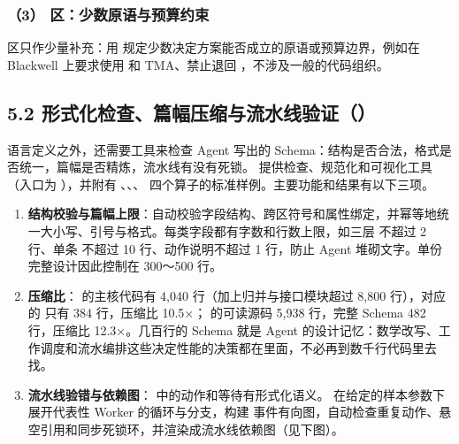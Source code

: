 \subsubsection{（3） 区：少数原语与预算约束}
 区只作少量补充：用  规定少数决定方案能否成立的原语或预算边界，例如在 Blackwell 上要求使用  和 TMA、禁止退回 ，不涉及一般的代码组织。


\newpage

\subsection{5.2 形式化检查、篇幅压缩与流水线验证（）}
语言定义之外，还需要工具来检查 Agent 写出的 Schema：结构是否合法，格式是否统一，篇幅是否精炼，流水线有没有死锁。 提供检查、规范化和可视化工具（入口为 ），并附有 、、、 四个算子的标准样例。主要功能和结果有以下三项。


\begin{enumerate}[start=1]
\item
\textbf{结构校验与篇幅上限}：自动校验字段结构、跨区符号和属性绑定，并幂等地统一大小写、引号与格式。每类字段都有字数和行数上限，如三层  不超过 2 行、单条  不超过 10 行、动作说明不超过 1 行，防止 Agent 堆砌文字。单份完整设计因此控制在 300～500 行。


\item
\textbf{压缩比}： 的主核代码有 4,040 行（加上归并与接口模块超过 8,800 行），对应的  只有 384 行，压缩比 10.5×； 的可读源码 5,938 行，完整 Schema 482 行，压缩比 12.3×。几百行的 Schema 就是 Agent 的设计记忆：数学改写、工作调度和流水编排这些决定性能的决策都在里面，不必再到数千行代码里去找。


\item
\textbf{流水线验错与依赖图}： 中的动作和等待有形式化语义。 在给定的样本参数下展开代表性 Worker 的循环与分支，构建  事件有向图，自动检查重复动作、悬空引用和同步死锁环，并渲染成流水线依赖图（见下图）。


\end{enumerate}

